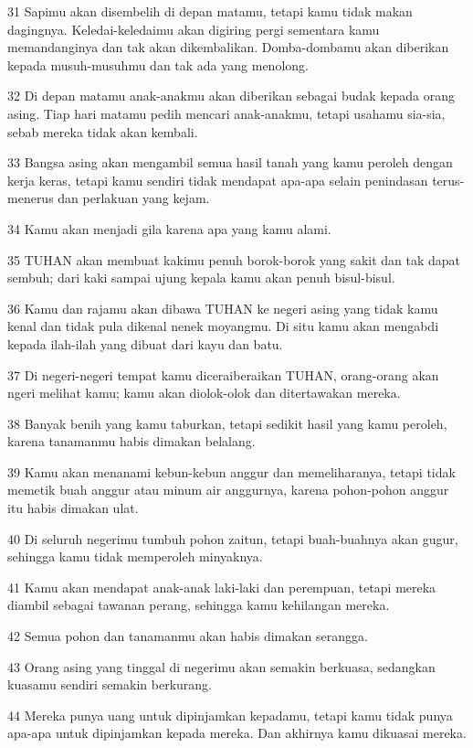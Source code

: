 \par 31 Sapimu akan disembelih di depan matamu, tetapi kamu tidak makan dagingnya. Keledai-keledaimu akan digiring pergi sementara kamu memandanginya dan tak akan dikembalikan. Domba-dombamu akan diberikan kepada musuh-musuhmu dan tak ada yang menolong.
\par 32 Di depan matamu anak-anakmu akan diberikan sebagai budak kepada orang asing. Tiap hari matamu pedih mencari anak-anakmu, tetapi usahamu sia-sia, sebab mereka tidak akan kembali.
\par 33 Bangsa asing akan mengambil semua hasil tanah yang kamu peroleh dengan kerja keras, tetapi kamu sendiri tidak mendapat apa-apa selain penindasan terus-menerus dan perlakuan yang kejam.
\par 34 Kamu akan menjadi gila karena apa yang kamu alami.
\par 35 TUHAN akan membuat kakimu penuh borok-borok yang sakit dan tak dapat sembuh; dari kaki sampai ujung kepala kamu akan penuh bisul-bisul.
\par 36 Kamu dan rajamu akan dibawa TUHAN ke negeri asing yang tidak kamu kenal dan tidak pula dikenal nenek moyangmu. Di situ kamu akan mengabdi kepada ilah-ilah yang dibuat dari kayu dan batu.
\par 37 Di negeri-negeri tempat kamu diceraiberaikan TUHAN, orang-orang akan ngeri melihat kamu; kamu akan diolok-olok dan ditertawakan mereka.
\par 38 Banyak benih yang kamu taburkan, tetapi sedikit hasil yang kamu peroleh, karena tanamanmu habis dimakan belalang.
\par 39 Kamu akan menanami kebun-kebun anggur dan memeliharanya, tetapi tidak memetik buah anggur atau minum air anggurnya, karena pohon-pohon anggur itu habis dimakan ulat.
\par 40 Di seluruh negerimu tumbuh pohon zaitun, tetapi buah-buahnya akan gugur, sehingga kamu tidak memperoleh minyaknya.
\par 41 Kamu akan mendapat anak-anak laki-laki dan perempuan, tetapi mereka diambil sebagai tawanan perang, sehingga kamu kehilangan mereka.
\par 42 Semua pohon dan tanamanmu akan habis dimakan serangga.
\par 43 Orang asing yang tinggal di negerimu akan semakin berkuasa, sedangkan kuasamu sendiri semakin berkurang.
\par 44 Mereka punya uang untuk dipinjamkan kepadamu, tetapi kamu tidak punya apa-apa untuk dipinjamkan kepada mereka. Dan akhirnya kamu dikuasai mereka.
